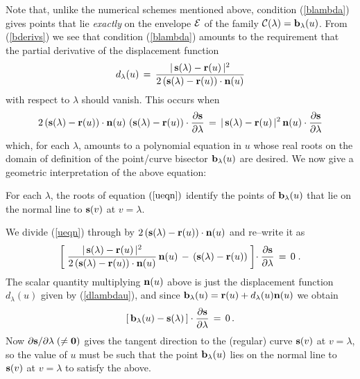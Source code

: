 {{Note that, unlike the numerical schemes mentioned above, condition
(\ref{blambda}) gives points that lie {\it exactly\/} on the envelope
${\cal E}$ of the family ${\cal C}(\lambda)={\bf b}_\lambda(u)$. From
(\ref{bderivs}) we see that condition (\ref{blambda}) amounts to the
requirement that the partial derivative of the displacement function
\begin{equation} \label{dlambdau}
d_\lambda(u) \,=\,
{|\,{\bf s}(\lambda)-{\bf r}(u)\,|^2 \over
2\,({\bf s}(\lambda)-{\bf r}(u))\cdot{\bf n}(u)}
\end{equation}
with respect to $\lambda$ should vanish. This occurs when
\begin{equation} \label{ueqn}
2\,({\bf s}(\lambda)-{\bf r}(u))\cdot{\bf n}(u) \,\,
   ({\bf s}(\lambda)-{\bf r}(u))\cdot
               {\partial{\bf s} \over \partial\lambda} \,=\,
|\,{\bf s}(\lambda)-{\bf r}(u)\,|^2 \,
{\bf n}(u)\cdot{\partial{\bf s} \over \partial\lambda}
\end{equation}
which, for each $\lambda$, amounts to a polynomial equation in
$u$ whose real roots on the domain of definition of the point/curve
bisector ${\bf b}_\lambda(u)$ are desired. We now give a geometric
interpretation of the above equation:

\begin{propn} \label{propn:normal}
For each $\lambda$, the roots of equation $(\ref{ueqn})$ identify
the points of ${\bf b}_\lambda(u)$ that lie on the normal line to
${\bf s}(v)$ at $v=\lambda$.
\end{propn}

\prf
We divide (\ref{ueqn}) through by $2\,({\bf s}(\lambda)-{\bf r}(u))
\cdot{\bf n}(u)$ and re--write it as
\begin{equation}
\left[\; {|\,{\bf s}(\lambda)-{\bf r}(u)\,|^2 \over
2\,({\bf s}(\lambda)-{\bf r}(u))\cdot{\bf n}(u)}\,{\bf n}(u)
\,-\, ({\bf s}(\lambda)-{\bf r}(u)) \;\right] \!\cdot
{\partial{\bf s} \over \partial\lambda} \,=\, 0 \;.
\end{equation}
The scalar quantity multiplying ${\bf n}(u)$ above is just the
displacement function $d_\lambda(u)$ given by (\ref{dlambdau}),
and since ${\bf b}_\lambda(u)={\bf r}(u)+d_\lambda(u){\bf n}(u)$
we obtain
\begin{equation}
\left[\,{\bf b}_\lambda(u)-{\bf s}(\lambda)\,\right] \cdot
{\partial{\bf s} \over \partial\lambda} \,=\, 0 \,.
\end{equation}
Now $\partial{\bf s}/\partial\lambda\;(\not={\bf 0})$ gives the
tangent direction to the (regular) curve ${\bf s}(v)$ at $v=\lambda$,
so the value of $u$ must be such that the point ${\bf b}_\lambda(u)$
lies on the normal line to ${\bf s}(v)$ at $v=\lambda$ to satisfy
the above.
\QED

}}
